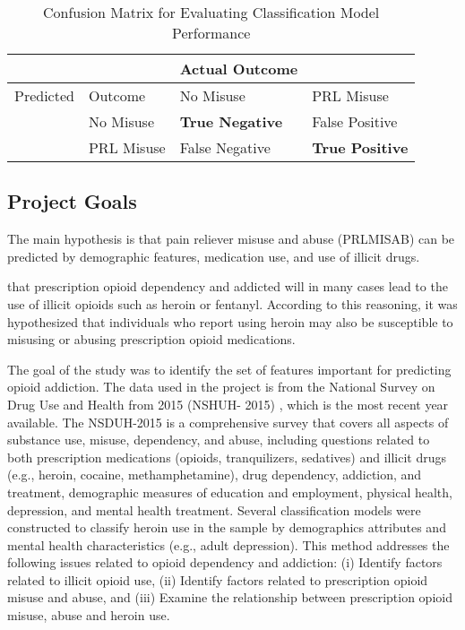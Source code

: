 \documentclass[sigconf]{acmart}
\begin{document}

\begin{table}
  \caption{Confusion Matrix for Evaluating Classification Model Performance}
  \label{tab:freq}
  \begin{tabular}{llll}
    \toprule
     &  &  Actual Outcome & \\
    \midrule
     Predicted & Outcome & No Misuse & PRL Misuse \\
    \midrule
     & No Misuse & \textbf{True Negative} & False Positive \\
    \midrule
     & PRL Misuse & False Negative & \textbf{True Positive} \\
    \bottomrule
  \end{tabular}
\end{table}

\subsection{Project Goals} 

The main hypothesis is that pain reliever misuse and abuse (PRLMISAB) can be
predicted by demographic features, medication use, and use of illicit drugs. 

that prescription opioid dependency and
addicted will in many cases lead to the use of illicit opioids such as heroin 
or fentanyl. 
According to this reasoning, it was hypothesized that individuals 
who report using heroin may also be susceptible to misusing or abusing 
prescription opioid medications. 

The goal of the study was to identify the set 
of features important for predicting opioid addiction. The data used in the 
project is from the National Survey on Drug Use and Health from 2015 (NSHUH-
2015) \cite{samhsa16}, which is the most recent year available. The NSDUH-2015 
is a comprehensive survey that covers all aspects of substance use, misuse, 
dependency, and abuse, including questions related to both prescription 
medications (opioids, tranquilizers, sedatives) and illicit drugs (e.g., 
heroin, cocaine, methamphetamine), drug dependency, addiction, and treatment, 
demographic measures of education and employment, physical health, depression, 
and mental health treatment. Several classification models were constructed to 
classify heroin use in the sample by demographics attributes and mental health 
characteristics (e.g., adult depression). This method addresses the following
issues related to opioid dependency and addiction: (i) Identify factors related 
to illicit opioid use, (ii) Identify factors related to prescription opioid 
misuse and abuse, and (iii) Examine the relationship between prescription 
opioid misuse, abuse and heroin use. 
\end{document}
